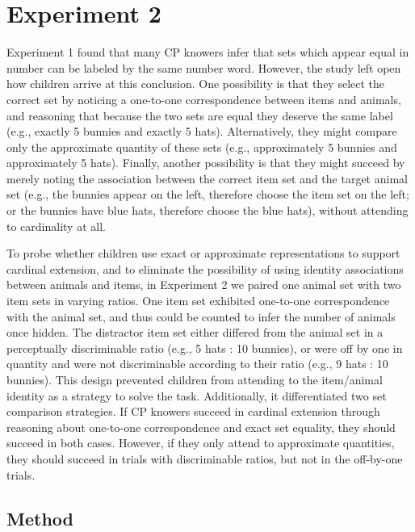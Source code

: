 \documentclass[
  man,floatsintext]{apa7}
\begin{document}
\hypertarget{experiment-2}{%
\section{Experiment 2}\label{experiment-2}}

Experiment 1 found that many CP knowers infer that sets which appear equal in number can be labeled by the same number word. However, the study left open how children arrive at this conclusion. One possibility is that they select the correct set by noticing a one-to-one correspondence between items and animals, and reasoning that because the two sets are equal they deserve the same label (e.g., exactly 5 bunnies and exactly 5 hats). Alternatively, they might compare only the approximate quantity of these sets (e.g., approximately 5 bunnies and approximately 5 hats). Finally, another possibility is that they might succeed by merely noting the association between the correct item set and the target animal set (e.g., the bunnies appear on the left, therefore choose the item set on the left; or the bunnies have blue hats, therefore choose the blue hats), without attending to cardinality at all.

To probe whether children use exact or approximate representations to support cardinal extension, and to eliminate the possibility of using identity associations between animals and items, in Experiment 2 we paired one animal set with two item sets in varying ratios. One item set exhibited one-to-one correspondence with the animal set, and thus could be counted to infer the number of animals once hidden. The distractor item set either differed from the animal set in a perceptually discriminable ratio (e.g., 5 hats : 10 bunnies), or were off by one in quantity and were not discriminable according to their ratio (e.g., 9 hats : 10 bunnies). This design prevented children from attending to the item/animal identity as a strategy to solve the task. Additionally, it differentiated two set comparison strategies. If CP knowers succeed in cardinal extension through reasoning about one-to-one correspondence and exact set equality, they should succeed in both cases. However, if they only attend to approximate quantities, they should succeed in trials with discriminable ratios, but not in the off-by-one trials.

\hypertarget{method-1}{%
\subsection{Method}\label{method-1}}
\end{document}
